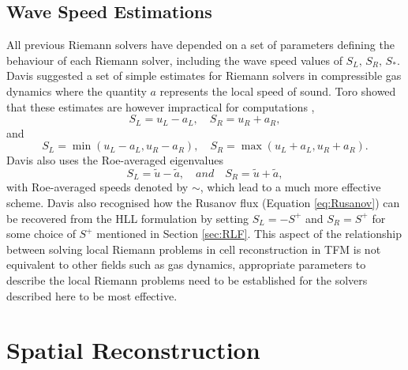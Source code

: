 \subsection{Wave Speed Estimations}
	All previous Riemann solvers have depended on a set of parameters defining the behaviour of each Riemann solver, including the wave speed values of $S_L,\,S_R,\,S_*$. Davis \cite{Davis88} suggested a set of simple estimates for Riemann solvers in compressible gas dynamics where the quantity $a$ represents the local speed of sound. Toro showed that these estimates are however impractical for computations \cite{Toro09},
	\begin{equation}
		S_L=u_L-a_L, \quad S_R=u_R+a_R, \nonumber
	\end{equation}
	and
	\begin{equation}
		S_L=\min\left(u_L-a_L,u_R-a_R\right), \quad S_R=\max\left(u_L+a_L,u_R+a_R\right). \nonumber
	\end{equation}
	Davis \cite{Davis88} also uses the Roe-averaged eigenvalues
	\begin{equation}
		S_L=\tilde u-\tilde a, \quad and \quad S_R=\tilde u+\tilde a, \nonumber
	\end{equation}
	with Roe-averaged speeds denoted by $\sim$, which lead to a much more effective scheme. Davis also recognised how the Rusanov flux (Equation \ref{eq:Rusanov}) can be recovered from the HLL formulation by setting $S_L=-S^+$ and $S_R=S^+$ for some choice of $S^+$ mentioned in Section \ref{sec:RLF}. This aspect of the relationship between solving local Riemann problems in cell reconstruction in TFM is not equivalent to other fields such as gas dynamics, appropriate parameters to describe the local Riemann problems need to be established for the solvers described here to be most effective.
	
\section{Spatial Reconstruction}

